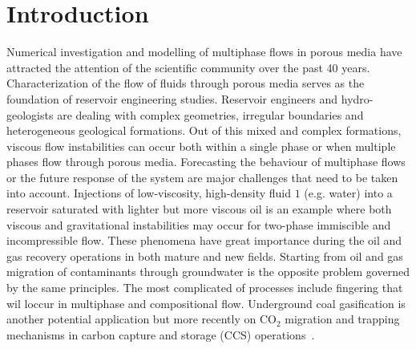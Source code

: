 \documentclass[preprint,authoryear,12pt]{elsarticle}
\newcommand{\KCnote}[1]{\fbox{\parbox{\textwidth}{ \color{black} KC Note $\Rightarrow$ #1}}}
\begin{document}

\clearpage


\section{Introduction}\label{section:Intro}

Numerical investigation and modelling of multiphase flows in porous media have attracted the attention of the scientific community over the past 40 years. Characterization of the flow of fluids through porous media serves as the foundation of reservoir engineering studies. Reservoir engineers and hydro-geologists are dealing with complex geometries, irregular boundaries and heterogeneous geological formations. Out of this mixed and complex formations, viscous flow instabilities can occur both within a single phase or when multiple phases flow through porous media. Forecasting the behaviour of multiphase flows or the future response of the system are major challenges that need to be taken into account. Injections of low-viscosity, high-density fluid $1$ (e.g. water) into a reservoir saturated with lighter but more viscous oil is an example where both viscous and gravitational instabilities may occur for two-phase immiscible and incompressible flow. These phenomena have great importance during the oil and gas recovery operations in both mature and new fields. Starting from oil and gas migration of contaminants through groundwater is the opposite problem governed by the same principles. The most complicated of processes include fingering that wil loccur in multiphase and compositional flow. Underground coal gasification is another potential application but more recently on CO$_{\text{2}}$ migration and trapping mechanisms in carbon capture and storage (CCS) operations~\citep{spycher_2003, chen_2006, self_2012, pruess_1990c, white_1981,jiang_2011}.
\end{document}
